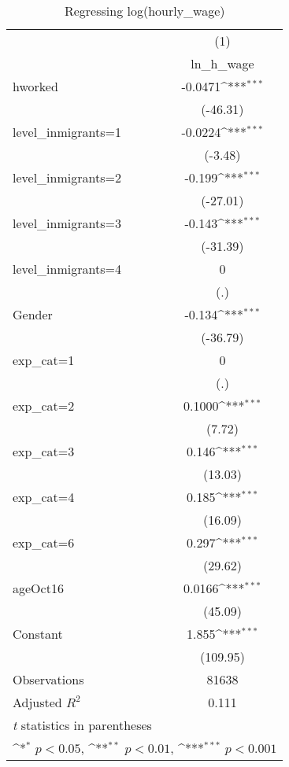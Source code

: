 \begin{table}[htbp]\centering
\def\sym#1{\ifmmode^{#1}\else\(^{#1}\)\fi}
\caption{Regressing log(hourly\_wage)}
\begin{tabular}{l*{1}{c}}
\hline\hline
                    &\multicolumn{1}{c}{(1)}\\
                    &\multicolumn{1}{c}{ln\_h\_wage}\\
\hline
hworked             &     -0.0471\sym{***}\\
                    &    (-46.31)         \\
[1em]
level\_inmigrants=1  &     -0.0224\sym{***}\\
                    &     (-3.48)         \\
[1em]
level\_inmigrants=2  &      -0.199\sym{***}\\
                    &    (-27.01)         \\
[1em]
level\_inmigrants=3  &      -0.143\sym{***}\\
                    &    (-31.39)         \\
[1em]
level\_inmigrants=4  &           0         \\
                    &         (.)         \\
[1em]
Gender              &      -0.134\sym{***}\\
                    &    (-36.79)         \\
[1em]
exp\_cat=1           &           0         \\
                    &         (.)         \\
[1em]
exp\_cat=2           &      0.1000\sym{***}\\
                    &      (7.72)         \\
[1em]
exp\_cat=3           &       0.146\sym{***}\\
                    &     (13.03)         \\
[1em]
exp\_cat=4           &       0.185\sym{***}\\
                    &     (16.09)         \\
[1em]
exp\_cat=6           &       0.297\sym{***}\\
                    &     (29.62)         \\
[1em]
ageOct16            &      0.0166\sym{***}\\
                    &     (45.09)         \\
[1em]
Constant            &       1.855\sym{***}\\
                    &    (109.95)         \\
\hline
Observations        &       81638         \\
Adjusted \(R^{2}\)  &       0.111         \\
\hline\hline
\multicolumn{2}{l}{\footnotesize \textit{t} statistics in parentheses}\\
\multicolumn{2}{l}{\footnotesize \sym{*} \(p<0.05\), \sym{**} \(p<0.01\), \sym{***} \(p<0.001\)}\\
\end{tabular}
\end{table}
